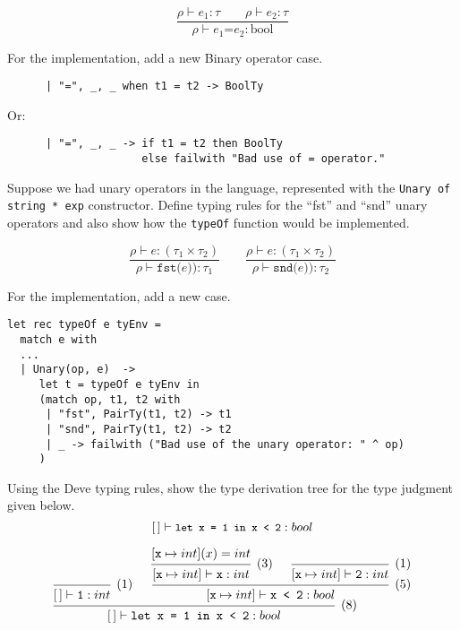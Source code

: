 \documentclass[addpoints]{exam}
\newcommand{\TJDG}[3]{#1 \vdash #2 : #3}
\begin{document}
\begin{questions}
  \begin{solutionbox}{5cm}
    \[
    \frac{\TJDG{\rho}{e_1}{\tau} \qquad \TJDG{\rho}{e_2}{\tau}}
         {\TJDG{\rho}{\texttt{$e_1$=$e_2$}}{\mathrm{bool}}}
    \]

    For the implementation, add a new Binary operator case.

    \begin{verbatim}
      | "=", _, _ when t1 = t2 -> BoolTy
    \end{verbatim}

    Or:

    \begin{verbatim}
      | "=", _, _ -> if t1 = t2 then BoolTy
                     else failwith "Bad use of = operator."
    \end{verbatim}
  \end{solutionbox}

  \question
  Suppose we had unary operators in the language,
  represented with the \texttt{Unary of string * exp}
  constructor.
  Define typing rules for the ``fst'' and ``snd'' unary operators and
  also show how the \texttt{typeOf} function would be implemented.

  \begin{solutionbox}{7cm}
    \[
    \frac{\TJDG{\rho}{e}{(\tau_1\times\tau_2)}}
         {\TJDG{\rho}{\texttt{fst($e$))}}{\tau_1}}
    \qquad
    \frac{\TJDG{\rho}{e}{(\tau_1\times\tau_2)}}
         {\TJDG{\rho}{\texttt{snd($e$))}}{\tau_2}}
    \]

    For the implementation, add a new case.

    \begin{verbatim}
let rec typeOf e tyEnv =
  match e with
  ...
  | Unary(op, e)  ->
     let t = typeOf e tyEnv in
     (match op, t1, t2 with
      | "fst", PairTy(t1, t2) -> t1
      | "snd", PairTy(t1, t2) -> t2
      | _ -> failwith ("Bad use of the unary operator: " ^ op)
     )
    \end{verbatim}
  \end{solutionbox}

  \question
  Using the Deve typing rules,
  show the type derivation tree for the type judgment
  given below.
  \[
  \small
  \TJDG{[\,]}{\texttt{let x = 1 in x < 2}}{bool} 
  \]

  \begin{solutionbox}{3cm}
    \[
    \begin{prooftree}
        \infer0[(1)]{\TJDG{[\,]}{\texttt{1}}{int}}
            \hypo{[\texttt{x}\mapsto int](x) = int}
          \infer1[(3)]{\TJDG{[\texttt{x}\mapsto int]}{\texttt{x}}{int}}
          \infer0[(1)]{\TJDG{[\texttt{x}\mapsto int]}{\texttt{2}}{int}}
        \infer2[(5)]{\TJDG{[\texttt{x}\mapsto int]}{\texttt{x < 2}}{bool}}
      \infer2[(8)]{\TJDG{[\,]}{\texttt{let x = 1 in x < 2}}{bool}}
    \end{prooftree}
    \]
  \end{solutionbox}


\end{questions}
\end{document}
